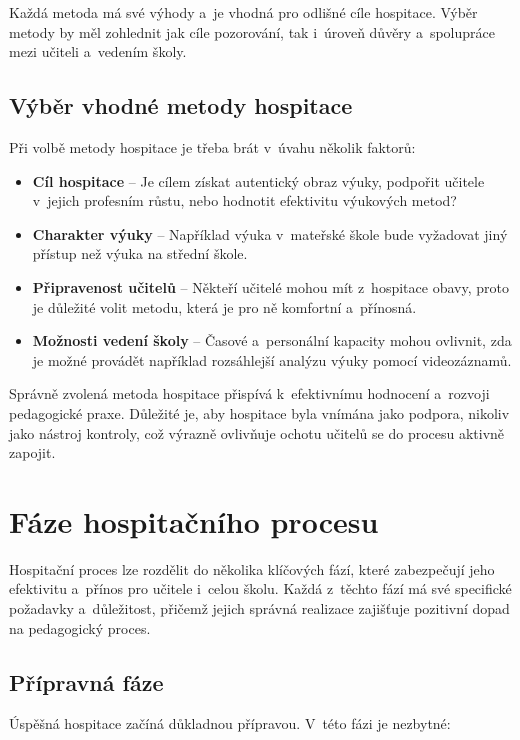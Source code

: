 Každá metoda má své výhody a~je vhodná pro odlišné cíle hospitace. Výběr metody by měl zohlednit jak cíle pozorování, tak i~úroveň důvěry a~spolupráce mezi učiteli a~vedením školy.

\subsection{Výběr vhodné metody hospitace}

Při volbě metody hospitace je třeba brát v~úvahu několik faktorů:

\begin{itemize}
    \item \textbf{Cíl hospitace} – Je cílem získat autentický obraz výuky, podpořit učitele v~jejich profesním růstu, nebo hodnotit efektivitu výukových metod?
    \item \textbf{Charakter výuky} – Například výuka v~mateřské škole bude vyžadovat jiný přístup než výuka na střední škole.
    \item \textbf{Připravenost učitelů} – Někteří učitelé mohou mít z~hospitace obavy, proto je důležité volit metodu, která je pro ně komfortní a~přínosná.
    \item \textbf{Možnosti vedení školy} – Časové a~personální kapacity mohou ovlivnit, zda je možné provádět například rozsáhlejší analýzu výuky pomocí videozáznamů.
\end{itemize}

Správně zvolená metoda hospitace přispívá k~efektivnímu hodnocení a~rozvoji pedagogické praxe. Důležité je, aby hospitace byla vnímána jako podpora, nikoliv jako nástroj kontroly, což výrazně ovlivňuje ochotu učitelů se do procesu aktivně zapojit.


\section{Fáze hospitačního procesu}

Hospitační proces lze rozdělit do několika klíčových fází, které zabezpečují jeho efektivitu a~přínos pro učitele i~celou školu. Každá z~těchto fází má své specifické požadavky a~důležitost, přičemž jejich správná realizace zajišťuje pozitivní dopad na pedagogický proces.

\subsection{Přípravná fáze}

Úspěšná hospitace začíná důkladnou přípravou. V~této fázi je nezbytné:

